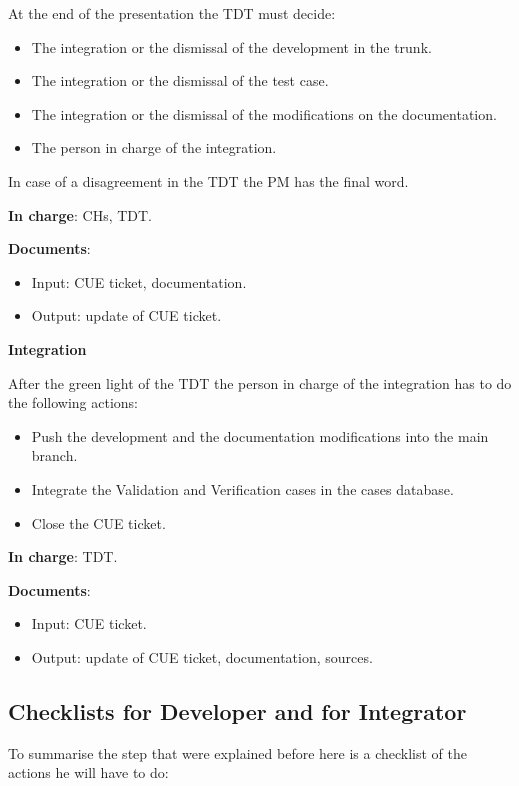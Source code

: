 At the end of the presentation the TDT must decide:
\begin{itemize}
\item The integration or the dismissal of the development in the trunk.
\item The integration or the dismissal of the test case.
\item The integration or the dismissal of the modifications on the
documentation.
\item The person in charge of the integration.
\end{itemize}

In case of a disagreement in the TDT the PM has the final word.

\textbf{In charge}: CHs, TDT\@.

\textbf{Documents}:
\begin{itemize}
\item Input: CUE ticket, documentation.
\item Output: update of CUE ticket.
\end{itemize}

\textbf{Integration}

After the green light of the TDT the person in charge of the integration has to
do the following actions:
\begin{itemize}
\item Push the development and the documentation modifications into the \telemacsystem{}
main branch.
\item Integrate the Validation and Verification cases in the cases database.
\item Close the CUE ticket.
\end{itemize}

\textbf{In charge}: TDT\@.

\textbf{Documents}:
\begin{itemize}
\item Input: CUE ticket.
\item Output: update of CUE ticket, documentation, sources.
\end{itemize}

\subsection{Checklists for Developer and for Integrator}

To summarise the step that were explained before here is a checklist of the
actions he will have to do:


